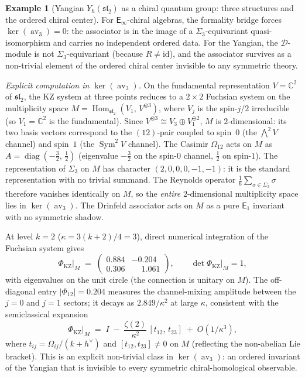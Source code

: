 \documentclass[11pt,reqno]{amsart}
\theoremstyle{definition}
\newtheorem{example}[theorem]{Example}
\theoremstyle{remark}
\newcommand{\cD}{\mathcal{D}}
\newcommand{\Eone}{\mathsf{E}_{1}}
\newcommand{\Einf}{\mathsf{E}_{\infty}}
\DeclareMathOperator{\Hom}{Hom}
\DeclareMathOperator{\av}{av}
\newcommand{\CC}{\mathbb{C}}
\newcommand{\id}{\mathrm{id}}
\numberwithin{equation}{section}
\begin{document}
\begin{example}[Yangian $Y_\hbar(\mathfrak{sl}_2)$
as a chiral quantum group: three structures and the
ordered chiral center]
For $\Einf$-chiral algebras, the formality bridge forces
$\ker(\av_3) = 0$: the associator is in the image of a
$\Sigma_3$-equivariant quasi-isomorphism and carries no
independent ordered data. For the Yangian, the
$\cD$-module is not $\Sigma_3$-equivariant (because
$R \neq \id$), and the associator survives as a non-trivial
element of the ordered chiral center invisible to any
symmetric theory.

\smallskip
\noindent\emph{Explicit computation in $\ker(\av_3)$.}
On the fundamental representation $V = \CC^2$ of
$\mathfrak{sl}_2$, the KZ system at three points reduces
to a $2 \times 2$ Fuchsian system on the multiplicity
space $M = \Hom_{\mathfrak{sl}_2}(V_1,\,
V^{\otimes 3})$, where $V_j$ is the spin-$j/2$
irreducible (so $V_1 = \CC^2$ is the fundamental).
Since $V^{\otimes 3} \cong V_3 \oplus V_1^{\oplus 2}$,
$M$ is $2$-dimensional: its two basis vectors correspond
to the $(12)$-pair coupled to spin~$0$ (the
$\bigwedge^2 V$ channel) and spin~$1$ (the
$\operatorname{Sym}^2 V$ channel). The Casimir
$\Omega_{12}$ acts on $M$ as
$A = \operatorname{diag}(-\tfrac{3}{2},\,\tfrac{1}{2})$
(eigenvalue $-\tfrac{3}{2}$ on the spin-$0$ channel,
$\tfrac{1}{2}$ on spin-$1$).
The representation of $\Sigma_3$ on $M$ has character
$(2,0,0,0,-1,-1)$: it is the standard representation
with no trivial summand. The Reynolds operator
$\tfrac{1}{6}\sum_{\sigma \in \Sigma_3} \sigma$ therefore
vanishes identically on $M$, so the \emph{entire}
$2$-dimensional multiplicity space lies in $\ker(\av_3)$.
The Drinfeld associator acts on $M$ as a pure $\Eone$
invariant with no symmetric shadow.

At level $k = 2$ ($\kappa = 3(k{+}2)/4 = 3$), direct
numerical integration of the Fuchsian system gives
\[
  \Phi_{\mathrm{KZ}}\big|_M
  \;=\;
  \begin{pmatrix}
    0.884 & -0.204 \\
    0.306 & \phantom{-}1.061
  \end{pmatrix},
  \qquad
  \det \Phi_{\mathrm{KZ}}\big|_M = 1,
\]
with eigenvalues on the unit circle (the connection is
unitary on $M$). The off-diagonal entry
$|\Phi_{12}| = 0.204$ measures the channel-mixing
amplitude between the $j = 0$ and $j = 1$ sectors; it
decays as $2.849/\kappa^2$ at large $\kappa$, consistent
with the semiclassical expansion
\[
  \Phi_{\mathrm{KZ}}\big|_M
  \;=\; I
  \;-\; \frac{\zeta(2)}{\kappa^2}\,[t_{12},\, t_{23}]
  \;+\; O(1/\kappa^3),
\]
where $t_{ij} = \Omega_{ij}/(k + h^\vee)$ and
$[t_{12}, t_{23}] \neq 0$ on $M$ (reflecting the
non-abelian Lie bracket). This is an explicit non-trivial
class in $\ker(\av_3)$: an ordered invariant of the
Yangian that is invisible to every symmetric
chiral-homological observable.


\end{example}
\end{document}
